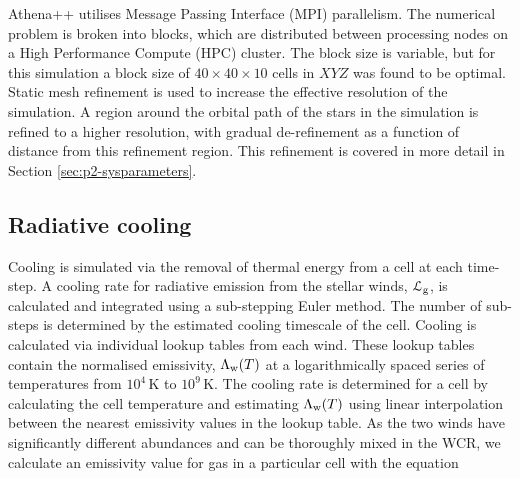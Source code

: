 Athena++ utilises Message Passing Interface (MPI) parallelism.
The numerical problem is broken into blocks, which are distributed between processing nodes on a High Performance Compute (HPC) cluster.
The block size is variable, but for this simulation a block size of $40\times 40 \times 10$ cells in $XYZ$ was found to be optimal.
Static mesh refinement is used to increase the effective resolution of the simulation.
A region around the orbital path of the stars in the simulation is refined to a higher resolution, with gradual de-refinement as a function of distance from this refinement region.
This refinement is covered in more detail in Section \ref{sec:p2-sysparameters}.

\subsection{Radiative cooling}

Cooling is simulated via the removal of thermal energy from a cell at each time-step.
A cooling rate for radiative emission from the stellar winds, $\mathcal{L}_\text{g}$, is calculated and integrated using a sub-stepping Euler method.
The number of sub-steps is determined by the estimated cooling timescale of the cell.
Cooling is calculated via individual lookup tables from each wind.
These lookup tables contain the normalised emissivity, $\Lambda_\text{w}(T)$ at a logarithmically spaced series of temperatures from $10^4 \, \si{\kelvin}$ to $10^9 \, \si{\kelvin}$.
The cooling rate is determined for a cell by calculating the cell temperature and estimating $\Lambda_\text{w}(T)$ using linear interpolation between the nearest emissivity values in the lookup table.
As the two winds have significantly different abundances and can be thoroughly mixed in the WCR, we calculate an emissivity value for gas in a particular cell with the equation

